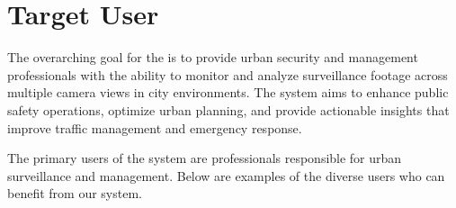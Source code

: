 \section{Target User}
\label{section:target-user}

The overarching goal for the \usevar{\srsTitle} is to provide urban security and management professionals with the ability to monitor and analyze surveillance footage across multiple camera views in city environments. The system aims to enhance public safety operations, optimize urban planning, and provide actionable insights that improve traffic management and emergency response.

The primary users of the system are professionals responsible for urban surveillance and management. Below are examples of the diverse users who can benefit from our system.

